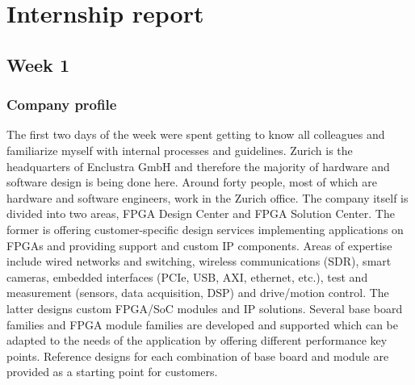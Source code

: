 \chapter{Internship report}
\section{Week 1}
\subsection{Company profile}
The first two days of the week were spent getting to know all colleagues and familiarize myself with internal processes and guidelines. Zurich is the headquarters of Enclustra GmbH and therefore the majority of hardware and software design is being done here. Around forty people, most of which are hardware and software engineers, work in the Zurich office. The company itself is divided into two areas, \ac{FPGA} Design Center and \ac{FPGA} Solution Center.
The former is offering customer-specific design services implementing applications on \acp{FPGA} and providing support and custom \ac{IP} components. Areas of expertise include wired networks and switching, wireless communications (\ac{SDR}), smart cameras, embedded interfaces (\ac{PCIe}, \ac{USB}, \ac{AXI}, ethernet, etc.), test and measurement (sensors, data acquisition, \ac{DSP}) and drive/motion control. 
The latter designs custom \ac{FPGA}/\ac{SoC} modules and \ac{IP} solutions. Several base board families and \ac{FPGA} module families are developed and supported which can be adapted to the needs of the application by offering different performance key points. Reference designs for each combination of base board and module are provided as a starting point for customers.
